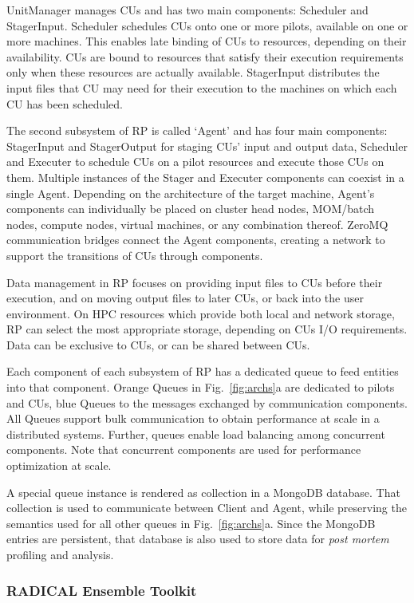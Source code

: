 \documentclass[preprint,12pt, a4paper]{elsarticle}
\begin{document}
UnitManager manages CUs and has two main components: Scheduler and
StagerInput. Scheduler schedules CUs onto one or more pilots, available on
one or more machines. This enables late binding of CUs to resources,
depending on their availability. CUs are bound to resources that satisfy
their execution requirements only when these resources are actually
available. StagerInput distributes the input files that CU may need for their
execution to the machines on which each CU has been scheduled.

The second subsystem of RP is called `Agent' and has four main components:
StagerInput and StagerOutput for staging CUs' input and output data,
Scheduler and Executer to schedule CUs on a pilot resources and execute those
CUs on them. Multiple instances of the Stager and Executer components can
coexist in a single Agent. Depending on the architecture of the target
machine, Agent's components can individually be placed on cluster head nodes,
MOM/batch nodes, compute nodes, virtual machines, or any combination thereof.
ZeroMQ communication bridges connect the Agent components, creating a network
to support the transitions of CUs through components.

Data management in RP focuses on providing input files to CUs before their
execution, and on moving output files to later CUs, or back into the user
environment. On HPC resources which provide both local and network storage,
RP can select the most appropriate storage, depending on CUs I/O
requirements.  Data can be exclusive to CUs, or can be shared between CUs.

Each component of each subsystem of RP has a dedicated queue to feed entities
into that component. Orange Queues in Fig.~\ref{fig:archs}a are dedicated to
pilots and CUs, blue Queues to the messages exchanged by communication
components. All Queues support bulk communication to obtain performance at
scale in a distributed systems. Further, queues enable load balancing among
concurrent components. Note that concurrent components are used for
performance optimization at scale.

A special queue instance is rendered as collection in a MongoDB database.
That collection is used to communicate between Client and Agent, while
preserving the semantics used for all other queues in Fig.~\ref{fig:archs}a.
Since the MongoDB entries are persistent, that database is also used to store
data for \textit{post mortem} profiling and analysis.

\subsubsection{RADICAL Ensemble Toolkit}\label{sssec:arch_entk}
\end{document}
